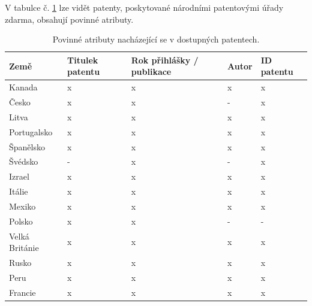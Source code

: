 \noindent V tabulce č. \ref{tab:table_attributes_critical} lze vidět patenty, poskytované národními patentovými úřady zdarma, obsahují povinné atributy.
	\begin{table}[H]
	\centering
	\begin{tabular}{|>{\centering\arraybackslash}p{2.2cm}|>{\centering\arraybackslash}p{2cm}|>{\centering\arraybackslash}p{3cm}|>{\centering\arraybackslash}p{2cm}|>{\centering\arraybackslash}p{2.5cm}|} 
	\hline
	\textbf{Země}    & \textbf{Titulek patentu} & \textbf{Rok přihlášky / publikace} & \textbf{Autor} & \textbf{ID patentu}                \\ 
	\hline
	Kanada & x & x & x & x \\
	\hline
	Česko & x & x & - & x \\
	\hline
	Litva & x & x & x & x \\
	\hline
	Portugalsko & x & x & x & x \\
	\hline
	Španělsko & x & x & x & x \\
	\hline
	Švédsko & - & x & - & x \\
	\hline
	Izrael & x & x & x & x \\
	\hline
	Itálie & x & x & x & x \\
	\hline
	Mexiko & x & x & x & x \\
	\hline
	Polsko & x & x & - & - \\
	\hline
	Velká Británie & x & x & x & x \\
	\hline
	Rusko & x & x & x & x \\
	\hline
	Peru & x & x & x & x \\
	\hline
	Francie & x & x & x & x \\
	\hline
	\end{tabular}
	\caption{Povinné atributy nacházející se v dostupných patentech.}
	\label{tab:table_attributes_critical}
	\end{table}


